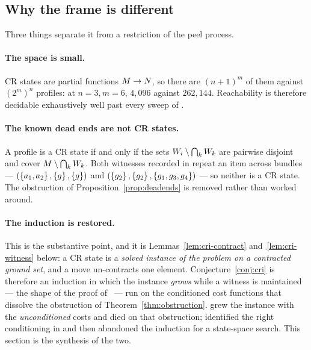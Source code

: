 \subsection{Why the frame is different}
\label{sec:cri-different}

Three things separate it from a restriction of the peel process.

\paragraph{The space is small.} CR states are partial functions $M \to
N$, so there are $(n+1)^m$ of them against $(2^m)^n$ profiles: at
$n = 3, m = 6$, $4{,}096$ against $262{,}144$. Reachability is therefore
decidable exhaustively well past every sweep of .

\paragraph{The known dead ends are not CR states.} A profile is a CR state if
and only if the sets $W_i \setminus \bigcap_k W_k$ are
pairwise disjoint and cover $M \setminus \bigcap_k W_k$. Both
witnesses recorded in  repeat an item across bundles ---
$(\left\{a_1,a_2\right\},\left\{g\right\},\left\{g\right\})$ and
$(\left\{g_2\right\},\left\{g_2\right\},\left\{g_1,g_3,g_4\right\})$ --- so neither is a CR state. The
obstruction of Proposition~\ref{prop:deadends} is removed rather than worked
around.

\paragraph{The induction is restored.} This is the substantive point, and it is
Lemmas~\ref{lem:cri-contract} and~\ref{lem:cri-witness} below: a CR state is a
\emph{solved instance of the problem on a contracted ground set}, and a move
un-contracts one element. Conjecture~\ref{conj:cri} is therefore an induction in
which the instance \emph{grows} while a witness is maintained --- the shape of
the proof of~\cite{BKNS22} --- run on the conditioned cost functions that
dissolve the obstruction of Theorem~\ref{thm:obstruction}.
 grew the instance with the \emph{unconditioned} costs and
died on that obstruction;  identified the right conditioning
in  and then abandoned the induction for a state-space
search. This section is the synthesis of the two.

